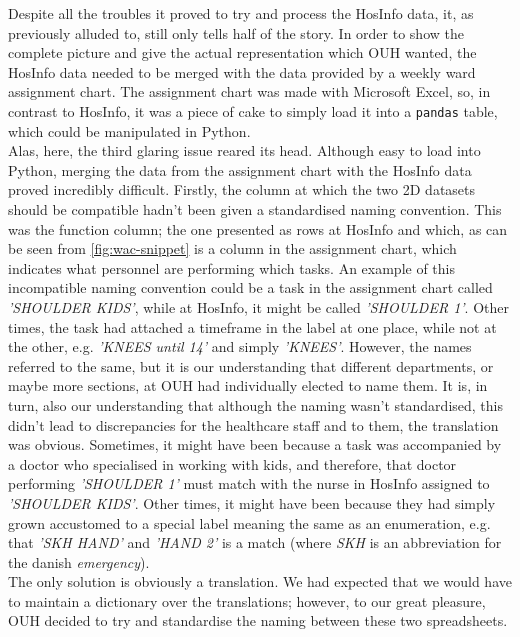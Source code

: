 Despite all the troubles it proved to try and process the HosInfo data, it, as previously alluded to,  still only tells half of the story. In order to show the complete picture and give the actual representation which OUH wanted, the HosInfo data needed to be merged with the data provided by a weekly ward assignment chart. The assignment chart was made with Microsoft Excel, so, in contrast to HosInfo, it was a piece of cake to simply load it into a \texttt{pandas} table, which could be manipulated in Python.
\\
Alas, here, the third glaring issue reared its head. Although easy to load into Python, merging the data from the assignment chart with the HosInfo data proved incredibly difficult. Firstly, the column at which the two 2D datasets should be compatible hadn't been given a standardised naming convention. This was the function column; the one presented as rows at HosInfo and which, as can be seen from \autoref{fig:wac-snippet} is a column in the assignment chart, which indicates what personnel are performing which tasks. An example of this incompatible naming convention could be a task in the assignment chart called \emph{'SHOULDER KIDS'}, while at HosInfo, it might be called \emph{'SHOULDER 1'}. Other times, the task had attached a timeframe in the label at one place, while not at the other, e.g. \emph{'KNEES until 14'} and simply \emph{'KNEES'}. However, the names referred to the same, but it is our understanding that different departments, or maybe more sections, at OUH had individually elected to name them. It is, in turn, also our understanding that although the naming wasn't standardised, this didn't lead to discrepancies for the healthcare staff and to them, the translation was obvious. Sometimes, it might have been because a task was accompanied by a doctor who specialised in working with kids, and therefore, that doctor performing \emph{'SHOULDER 1'} must match with the nurse in HosInfo assigned to \emph{'SHOULDER KIDS'}. Other times, it might have been because they had simply grown accustomed to a special label meaning the same as an enumeration, e.g. that \emph{'SKH HAND'} and \emph{'HAND 2'} is a match (where \emph{SKH} is an abbreviation for the danish \emph{emergency}).
\\
The only solution is obviously a translation. We had expected that we would have to maintain a \gls{dictionary} over the translations; however, to our great pleasure, OUH decided to try and standardise the naming between these two spreadsheets.